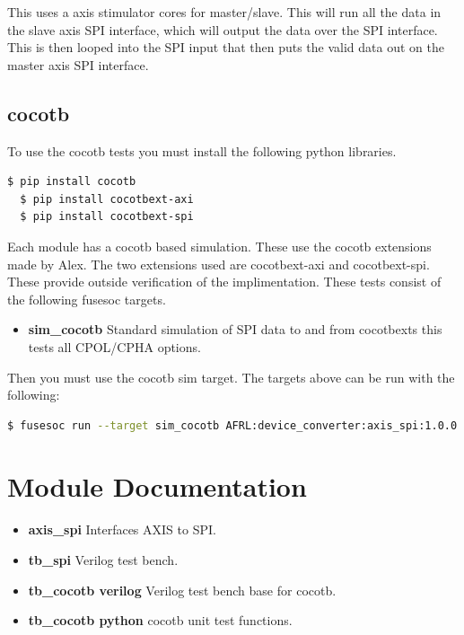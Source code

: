 This uses a axis stimulator cores for master/slave. This will run all the data in the slave axis SPI interface, which
will output the data over the SPI interface. This is then looped into the SPI input that then puts the valid data out
on the master axis SPI interface.

\subsection{cocotb}
\par
To use the cocotb tests you must install the following python libraries.
\begin{lstlisting}[language=bash]
  $ pip install cocotb
  $ pip install cocotbext-axi
  $ pip install cocotbext-spi
\end{lstlisting}

Each module has a cocotb based simulation. These use the cocotb extensions made by Alex.
The two extensions used are cocotbext-axi and cocotbext-spi. These provide outside verification
of the implimentation. These tests consist of the following fusesoc targets.

\begin{itemize}
  \item \textbf{sim\_cocotb} Standard simulation of SPI data to and from cocotbexts this tests all CPOL/CPHA options.
\end{itemize}

Then you must use the cocotb sim target. The targets above can be run with the following:
\begin{lstlisting}[language=bash]
  $ fusesoc run --target sim_cocotb AFRL:device_converter:axis_spi:1.0.0
\end{lstlisting}

\newpage

\section{Module Documentation} \label{Module Documentation}

\begin{itemize}
  \item \textbf{axis\_spi} Interfaces AXIS to SPI.\\
  \item \textbf{tb\_spi} Verilog test bench.\\
  \item \textbf{tb\_cocotb verilog} Verilog test bench base for cocotb.\\
  \item \textbf{tb\_cocotb python} cocotb unit test functions.\\
\end{itemize}


